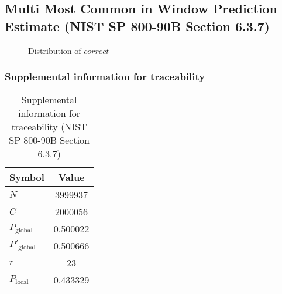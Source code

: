 \documentclass[a3paper,xelatex,english]{bxjsarticle}
\begin{document}
\subsection{Multi Most Common in Window Prediction Estimate (NIST SP 800-90B Section 6.3.7)}
\begin{figure}[htbp]
\caption{Distribution of $correct$}
\end{figure}
\subsubsection{Supplemental information for traceability}
\renewcommand{\arraystretch}{1.8}
\begin{table}[h]
\caption{Supplemental information for traceability (NIST SP 800-90B Section 6.3.7)}
\begin{center}
\begin{tabular}{|l|c|}
\hline 
\rowcolor{anotherlightblue} %
Symbol				& Value \\ \hline 
$N$				& 3999937\\ \hline 
$C$				& 2000056\\ \hline 
$P_{\textrm{global}}$				& 0.500022\\ \hline 
$P'_{\textrm{global}}$			& 0.500666\\ \hline 
$r$				& 23\\ \hline 
$P_{\textrm{local}}$ 			& 0.433329\\ \hline
\end{tabular}
\end{center}
\end{table}
\renewcommand{\arraystretch}{1.4}
\clearpage
\end{document}
